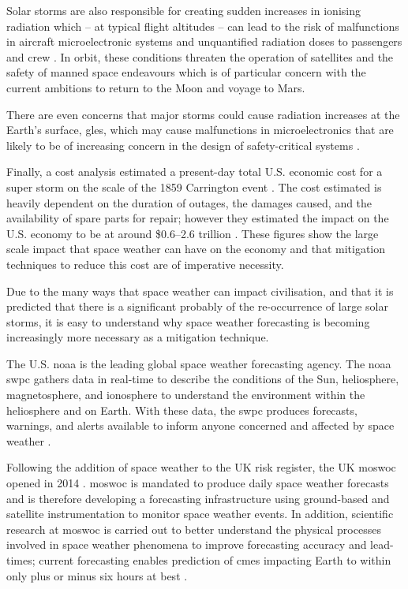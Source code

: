 Solar storms are also responsible for creating sudden increases in ionising radiation which -- at typical flight altitudes -- can lead to the risk of malfunctions in aircraft microelectronic systems and unquantified radiation doses to passengers and crew \citep{cannon_extreme_2013}. In orbit, these conditions threaten the operation of satellites and the safety of manned space endeavours which is of particular concern with the current ambitions to return to the Moon and voyage to Mars. 

There are even concerns that major storms could cause radiation increases at the Earth's surface, \glspl{gle}, which may cause malfunctions in microelectronics that are likely to be of increasing concern in the design of safety-critical systems \citep{cannon_extreme_2013}. 

Finally, a cost analysis estimated a present-day total U.S. economic cost for a super storm on the scale of the 1859 Carrington event \citep{homeier_solar_2013}. The cost estimated is heavily dependent on the duration of outages, the damages caused, and the availability of spare parts for repair; however they estimated the impact on the U.S. economy to be at around \$0.6--2.6 trillion \citep{homeier_solar_2013}. These figures show the large scale impact that space weather can have on the economy and that mitigation techniques to reduce this cost are of imperative necessity.

Due to the many ways that space weather can impact civilisation, and that it is predicted that there is a significant probably of the re-occurrence of large solar storms, it is easy to understand why space weather forecasting is becoming increasingly more necessary as a mitigation technique. 

The U.S. \gls{noaa} is the leading global space weather forecasting agency. The \gls{noaa} \gls{swpc} gathers data in real-time to describe the conditions of the Sun, heliosphere, magnetosphere, and ionosphere to understand the environment within the heliosphere and on Earth. With these data, the \gls{swpc} produces forecasts, warnings, and alerts available to inform anyone concerned and affected by space weather \citep{noaa_noaa_2018}. 

Following the addition of space weather to the UK risk register, the UK \gls{moswoc} opened in 2014 \citep{bis_space_2015}. \gls{moswoc} is mandated to produce daily space weather forecasts and is therefore developing a forecasting infrastructure using ground-based and satellite instrumentation to monitor space weather events. In addition, scientific research at \gls{moswoc} is carried out to better understand the physical processes involved in space weather phenomena to improve forecasting accuracy and lead-times; current forecasting enables prediction of \glspl{cme} impacting Earth to within only plus or minus six hours at best \citep{metoffice_space_2013}.

